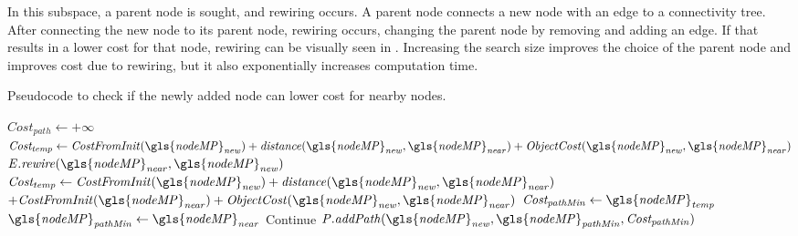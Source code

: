 In this subspace, a parent node is sought, and rewiring occurs. A parent node connects a new node with an edge to a connectivity tree. After connecting the new node to its parent node, rewiring occurs, changing the parent node by removing and adding an edge. If that results in a lower cost for that node, rewiring can be visually seen in . Increasing the search size improves the choice of the parent node and improves cost due to rewiring, but it also exponentially increases computation time.

\begin{algorithm}[H]
\caption{Pseudocode to check if the newly added node can lower cost for nearby nodes.}%
\label{pseudocode:proposed_rrt_star_three}
\begin{algorithmic}[1]
\hspace{-0.9cm}\colorbox{my_green}{\parbox{\linewidth}{%
    \State $\mathit{Cost_{path}} \leftarrow +\infty$ 
    \State $\mathit{Cost_{temp}} \leftarrow \mathit{CostFromInit(\gls{nodeMP}_{new}) + distance(\gls{nodeMP}_{new}, \gls{nodeMP}_{near}) + ObjectCost(\gls{nodeMP}_{new}, \gls{nodeMP}_{near})}$
    \State $\mathit{E.rewire(\gls{nodeMP}_{near}, \gls{nodeMP}_{new})}$
           \EndIf
        \EndIf
      \Else {}
      \State $\mathit{Cost_{temp} \leftarrow CostFromInit(\gls{nodeMP}_{new}) + distance(\gls{nodeMP}_{new}, \gls{nodeMP}_{near})} $ \newline\hspace*{10em} $+ \mathit{CostFromInit(\gls{nodeMP}_{near}) + ObjectCost(\gls{nodeMP}_{new}, \gls{nodeMP}_{near})}$
          \State $\mathit{Cost_{pathMin} \leftarrow \gls{nodeMP}_{temp}}$
          \State $\mathit{\gls{nodeMP}_{pathMin} \leftarrow \gls{nodeMP}_{near}}$
              \EndIf
          \EndIf
      \EndIf
          \State Continue
      \Else
      \State $\mathit{P.addPath(\gls{nodeMP}_{new}, \gls{nodeMP}_{pathMin}, Cost_{pathMin})}$
      \EndIf
    \EndFor
}}
\end{algorithmic}
\end{algorithm}

